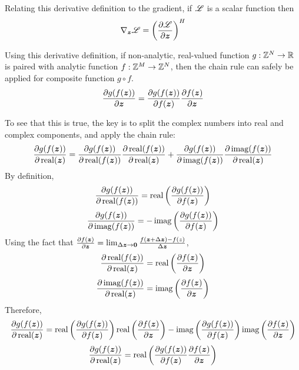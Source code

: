 \begin{appendices}
Relating this derivative definition to the gradient, if $\mathscr{L}$ is a scalar function then
\begin{equation}
\nabla_{\bm{z}} \mathscr{L} = \left(\frac{\partial \mathscr{L}}{\partial \bm{z}}\right)^H
\end{equation}

Using this derivative definition, if non-analytic, real-valued function $g: \mathbb{Z}^N \rightarrow \mathbb{R}$ is paired with analytic function $f: \mathbb{Z}^M \rightarrow \mathbb{Z}^N$, then the chain rule can safely be applied for composite function $g \circ f$.
\begin{equation}
\frac{\partial g(f(\bm{z}))}{\partial \bm{z}} = \frac{\partial g(f(\bm{z}))}{\partial f(\bm{z})}\frac{\partial f(\bm{z})}{\partial \bm{z}}
\end{equation}

To see that this is true, the key is to split the complex numbers into real and complex components, and apply the chain rule:
\begin{equation}
\frac{\partial g(f(\bm{z}))}{\partial \operatorname{real}(\bm{z})} = \frac{\partial g(f(\bm{z}))}{\partial \operatorname{real}(f(\bm{z}))}\frac{\partial \operatorname{real}(f(\bm{z}))}{\partial \operatorname{real}(\bm{z})} + \frac{\partial g(f(\bm{z}))}{\partial \operatorname{imag}(f(\bm{z}))}\frac{\partial \operatorname{imag}(f(\bm{z}))}{\partial \operatorname{real}(\bm{z})}
\end{equation}
By definition,
\begin{equation}
\frac{\partial g(f(\bm{z}))}{\partial \operatorname{real}(f(\bm{z}))} = \operatorname{real}\left(\frac{\partial g(f(\bm{z}))}{\partial f(\bm{z})}\right)
\end{equation}
\begin{equation}
\frac{\partial g(f(\bm{z}))}{\partial \operatorname{imag}(f(\bm{z}))} = -\operatorname{imag}\left(\frac{\partial g(f(\bm{z}))}{\partial f(\bm{z})}\right)
\end{equation}
Using the fact that $\frac{\partial f(\bm{z})}{\partial \bm{z}} = \lim_{\Delta \bm{z} \rightarrow \bm{0}} \frac{f(\bm{z} + \Delta \bm{z}) - f(z)}{\Delta \bm{z}}$,
\begin{equation}
\frac{\partial \operatorname{real}(f(\bm{z}))}{\partial \operatorname{real}(\bm{z})} = \operatorname{real}\left(\frac{\partial f(\bm{z})}{\partial \bm{z}}\right)
\end{equation}
\begin{equation}
\frac{\partial \operatorname{imag}(f(\bm{z}))}{\partial \operatorname{real}(\bm{z})} = \operatorname{imag}\left(\frac{\partial f(\bm{z})}{\partial \bm{z}}\right)
\end{equation}
Therefore,
\begin{equation}
\frac{\partial g(f(\bm{z}))}{\partial \operatorname{real}(\bm{z})} = \operatorname{real}\left(\frac{\partial g(f(\bm{z}))}{\partial f(\bm{z})}\right)\operatorname{real}\left(\frac{\partial f(\bm{z})}{\partial \bm{z}}\right) - \operatorname{imag}\left(\frac{\partial g(f(\bm{z}))}{\partial f(\bm{z})}\right)\operatorname{imag}\left(\frac{\partial f(\bm{z})}{\partial \bm{z}}\right)
\end{equation}
\begin{equation} \label{equation:Partial Derivative for Real Component}
\frac{\partial g(f(\bm{z}))}{\partial \operatorname{real}(\bm{z})} = \operatorname{real}\left(\frac{\partial g(f(\bm{z}))}{\partial f(\bm{z})}\frac{\partial f(\bm{z})}{\partial \bm{z}}\right)
\end{equation}


\end{appendices}
